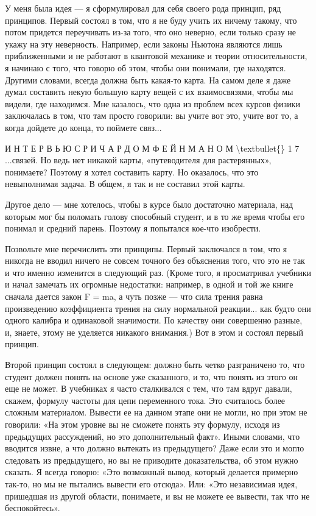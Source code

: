 \documentclass[10pt,oneside]{article}
\begin{document}
У меня была идея --- я сформулировал для себя своего рода принцип, ряд принципов. Первый состоял в том, что я не буду учить их ничему такому, что потом придется переучивать из-за того, что оно неверно, если только сразу не укажу на эту неверность. Например, если законы Ньютона являются лишь приближенными и не работают в квантовой механике и теории относительности, я начинаю с того, что говорю об этом, чтобы они понимали, где находятся. Другими словами, всегда должна быть какая-то карта. На самом деле я даже думал составить некую большую карту вещей с их взаимосвязями, чтобы мы видели, где находимся. Мне казалось, что одна из проблем всех курсов физики заключалась в том, что там просто говорили: вы учите вот это, учите вот то, а когда дойдете до конца, то поймете связ...\par

И Н Т Е Р В Ь Ю  С  Р И Ч А Р Д О М  Ф Е Й Н М А Н О М \textbackslash{}textbullet\{\} 1 7 ...связей. Но ведь нет никакой карты, «путеводителя для растерянных», понимаете? Поэтому я хотел составить карту. Но оказалось, что это невыполнимая задача. В общем, я так и не составил этой карты.\par

Другое дело --- мне хотелось, чтобы в курсе было достаточно материала, над которым мог бы поломать голову способный студент, и в то же время чтобы его понимал и средний парень. Поэтому я попытался кое-что изобрести.\par

Позвольте мне перечислить эти принципы. Первый заключался в том, что я никогда не вводил ничего не совсем точного без объяснения того, что это не так и что именно изменится в следующий раз. (Кроме того, я просматривал учебники и начал замечать их огромные недостатки: например, в одной и той же книге сначала дается закон F = ma, а чуть позже --- что сила трения равна произведению коэффициента трения на силу нормальной реакции... как будто они одного калибра и одинаковой значимости. По качеству они совершенно разные, и, знаете, этому не уделяется никакого внимания.) Вот в этом и состоял первый принцип.\par

Второй принцип состоял в следующем: должно быть четко разграничено то, что студент должен понять на основе уже сказанного, и то, что понять из этого он еще не может. В учебниках я часто сталкивался с тем, что там вдруг давали, скажем, формулу частоты для цепи переменного тока. Это считалось более сложным материалом. Вывести ее на данном этапе они не могли, но при этом не говорили: «На этом уровне вы не сможете понять эту формулу, исходя из предыдущих рассуждений, но это дополнительный факт». Иными словами, что вводится извне, а что должно вытекать из предыдущего? Даже если это и могло следовать из предыдущего, но вы не приводите доказательства, об этом нужно сказать. Я всегда говорю: «Это возможный вывод, который делается примерно так-то, но мы не пытались вывести его отсюда». Или: «Это независимая идея, пришедшая из другой области, понимаете, и вы не можете ее вывести, так что не беспокойтесь».\par
\end{document}
